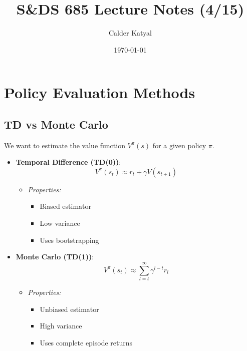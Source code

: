 \documentclass{article}
\title{S\&DS 685 Lecture Notes (4/15)}
\author{Calder Katyal}
\date{\today}
\begin{document}
\maketitle
\tableofcontents

\section{Policy Evaluation Methods}

\subsection{TD vs Monte Carlo}
We want to estimate the value function $V^\pi(s)$ for a given policy $\pi$.

\begin{itemize}
    \item \textbf{Temporal Difference (TD(0))}:
        \begin{equation}
            V^\pi(s_t) \approx r_t + \gamma V(s_{t+1})
        \end{equation}
        \begin{itemize}
            \item \textit{Properties:}
                \begin{itemize}
                    \item Biased estimator
                    \item Low variance
                    \item Uses bootstrapping
                \end{itemize}
        \end{itemize}
    
    \item \textbf{Monte Carlo (TD(1))}:
        \begin{equation}
            V^\pi(s_t) \approx \sum_{l=t}^\infty \gamma^{l - t} r_l
        \end{equation}
        \begin{itemize}
            \item \textit{Properties:}
                \begin{itemize}
                    \item Unbiased estimator
                    \item High variance
                    \item Uses complete episode returns
                \end{itemize}
        \end{itemize}
\end{itemize}
\end{document}
